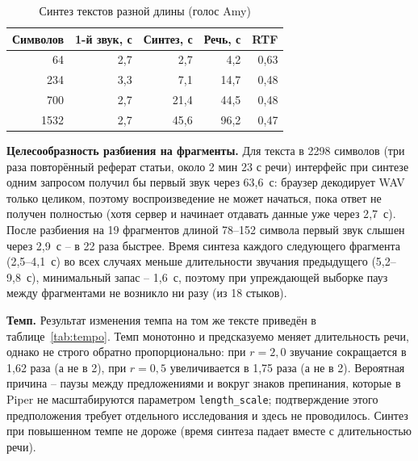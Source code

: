 \begin{table}[H]
  \centering
  \caption{Синтез текстов разной длины (голос Amy)}
  \label{tab:tts-length}
  \small
  \begin{tabular}{|r|r|r|r|r|}
    \hline
    Символов & 1-й звук, с & Синтез, с & Речь, с & RTF \\
    \hline
    64 & 2{,}7 & 2{,}7 & 4{,}2 & 0{,}63 \\
    \hline
    234 & 3{,}3 & 7{,}1 & 14{,}7 & 0{,}48 \\
    \hline
    700 & 2{,}7 & 21{,}4 & 44{,}5 & 0{,}48 \\
    \hline
    1532 & 2{,}7 & 45{,}6 & 96{,}2 & 0{,}47 \\
    \hline
  \end{tabular}
\end{table}

\textbf{Целесообразность разбиения на фрагменты.} Для текста в 2298
символов (три раза повторённый реферат статьи, около 2 мин 23 с речи)
интерфейс при синтезе одним запросом получил бы первый звук через
63{,}6~с: браузер декодирует WAV только целиком, поэтому воспроизведение
не может начаться, пока ответ не получен полностью (хотя сервер и
начинает отдавать данные уже через 2{,}7~с). После разбиения на 19
фрагментов длиной 78--152 символа первый звук слышен через 2{,}9~с --
в 22 раза быстрее. Время синтеза каждого следующего фрагмента
(2{,}5--4{,}1~с) во всех случаях меньше длительности звучания
предыдущего (5{,}2--9{,}8~с), минимальный запас -- 1{,}6~с, поэтому
при упреждающей выборке пауз между фрагментами не возникло ни разу (из
18 стыков).

\textbf{Темп.} Результат изменения темпа на том же тексте приведён в
таблице~\ref{tab:tempo}. Темп монотонно и предсказуемо меняет
длительность речи, однако не строго обратно пропорционально:
при $r = 2{,}0$ звучание сокращается в 1{,}62 раза (а не в 2), при
$r = 0{,}5$ увеличивается в 1{,}75 раза (а не в 2). Вероятная причина --
паузы между предложениями и вокруг знаков препинания, которые в Piper
не масштабируются параметром \texttt{length\_scale}; подтверждение этого
предположения требует отдельного исследования и здесь не проводилось.
Синтез при повышенном темпе не дороже (время синтеза падает вместе с
длительностью речи).

